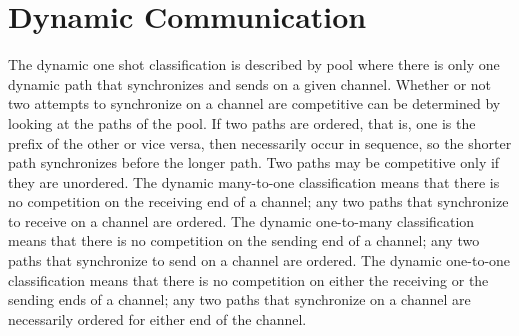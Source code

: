 \documentclass[10pt]{article}
\begin{document}
\section{Dynamic Communication}

The dynamic one shot classification is described by pool where there is only one dynamic path
that synchronizes and sends on a given channel. Whether or not two attempts to
synchronize on a channel are competitive can be determined by
looking at the paths of the pool. If two paths are ordered, that is, one is the
prefix of the other or vice versa, then necessarily
occur in sequence, so the shorter path synchronizes before the longer path. Two paths may
be competitive only if they are unordered. The dynamic many-to-one classification means that
there is no competition on the receiving end of a channel; any two paths that synchronize to
receive on a channel are ordered. The dynamic one-to-many classification means that there
is no competition on the sending end of a channel; any two paths that synchronize to
send on a channel are ordered. The dynamic one-to-one classification means that there is no
competition on either the receiving or the sending ends of a channel; any two paths that
synchronize on a channel are necessarily ordered for either end of the channel. 
\end{document}
